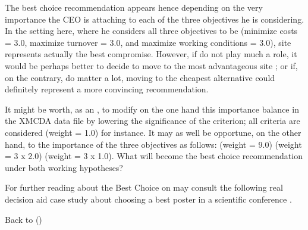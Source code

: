 \documentclass[a4paper,10pt,english]{sphinxhowto}
\begin{document}
The best choice recommendation appears hence depending on the very
importance the CEO is attaching to each of the three objectives he is
considering. In the setting here, where he considers all three
objectives to be  (minimize costs = 3.0, maximize
turnover = 3.0, and maximize working conditions = 3.0), site 
represents actually the best compromise. However, if  do not
play much a role, it would be perhaps better to decide to move to the most advantageous site ; or if, on the contrary,  do matter a lot, moving to the cheapest alternative  could definitely represent a more convincing recommendation.

It might be worth, as an , to modify on the one hand this importance balance in the XMCDA data file by lowering the significance of the  criterion; all criteria are considered  (weight = 1.0) for instance. It may as well be opportune, on the other hand, to  the importance of the three objectives as follows:   (weight = 9.0) \sphinxstylestrong{\textgreater{}}  (weight = 3 x 2.0) \sphinxstylestrong{\textgreater{}}  (weight = 3 x 1.0). What will become the best choice recommendation under both working hypotheses?

For further reading about the  Best Choice on may consult the following real decision aid case study about choosing a best poster in a scientific conference  .

Back to {\hyperref[\detokenize{tutorial:tutorial-label}]{}} ()
\end{document}
